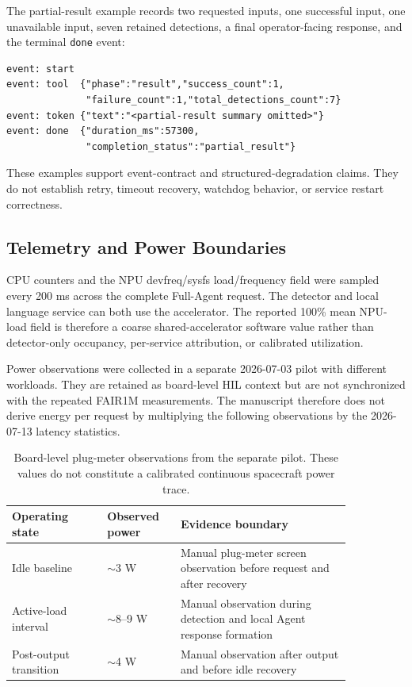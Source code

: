 The partial-result example records two requested inputs, one successful input, one unavailable input, seven retained detections, a final operator-facing response, and the terminal \texttt{done} event:

\begin{small}
\begin{verbatim}
event: start
event: tool  {"phase":"result","success_count":1,
              "failure_count":1,"total_detections_count":7}
event: token {"text":"<partial-result summary omitted>"}
event: done  {"duration_ms":57300,
              "completion_status":"partial_result"}
\end{verbatim}
\end{small}

These examples support event-contract and structured-degradation claims. They do not establish retry, timeout recovery, watchdog behavior, or service restart correctness.

\subsection{Telemetry and Power Boundaries}

CPU counters and the NPU devfreq/sysfs load/frequency field were sampled every 200 ms across the complete Full-Agent request. The detector and local language service can both use the accelerator. The reported 100\% mean NPU-load field is therefore a coarse shared-accelerator software value rather than detector-only occupancy, per-service attribution, or calibrated utilization.

Power observations were collected in a separate 2026-07-03 pilot with different workloads. They are retained as board-level HIL context but are not synchronized with the repeated FAIR1M measurements. The manuscript therefore does not derive energy per request by multiplying the following observations by the 2026-07-13 latency statistics.

\begin{table}[H]
\centering
\renewcommand{\arraystretch}{1.14}
\setlength{\tabcolsep}{4pt}
\caption{Board-level plug-meter observations from the separate pilot. These values do not constitute a calibrated continuous spacecraft power trace.}
\label{tab:power_snapshot}
\begin{tabular}{p{0.24\linewidth}p{0.18\linewidth}p{0.43\linewidth}}
\toprule
\rowcolor{gray!12}
\textbf{Operating state} & \textbf{Observed power} & \textbf{Evidence boundary} \\
\midrule
Idle baseline & $\sim$3 W & Manual plug-meter screen observation before request and after recovery \\
\rowcolor{graybg}
Active-load interval & $\sim$8--9 W & Manual observation during detection and local Agent response formation \\
Post-output transition & $\sim$4 W & Manual observation after output and before idle recovery \\
\bottomrule
\end{tabular}
\end{table}

